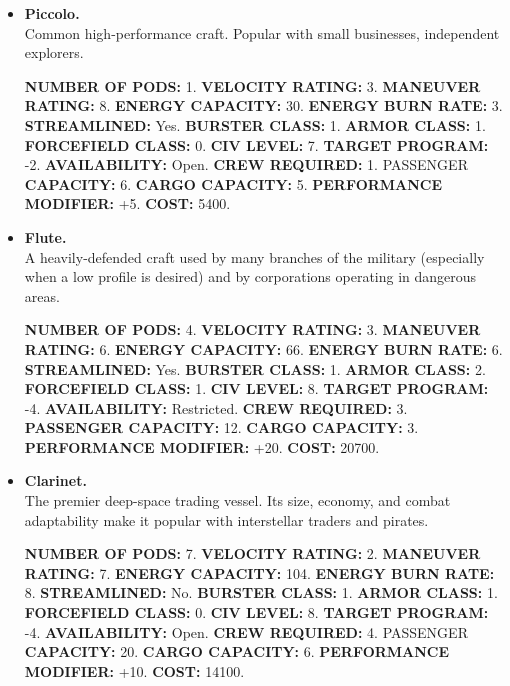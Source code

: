 \begin{itemize}
\item\textbf{\hypertarget{tag:harmonics-piccolo}{Piccolo}.}\\
  Common high-performance craft. Popular with small businesses,
  independent explorers.
  
  \textbf{NUMBER OF PODS:} 1. \textbf{VELOCITY RATING:} 3.
  \textbf{MANEUVER RATING:} 8. \textbf{ENERGY CAPACITY:} 30.
  \textbf{ENERGY BURN RATE:} 3. \textbf{STREAMLINED:}
  Yes. \textbf{BURSTER CLASS:} 1. \textbf{ARMOR CLASS:} 1.
  \textbf{FORCEFIELD CLASS:} 0. \textbf{CIV LEVEL:} 7. \textbf{TARGET
    PROGRAM:} -2. \textbf{AVAILABILITY:} Open. \textbf{CREW REQUIRED:}
  1. PASSENGER \textbf{CAPACITY:} 6. \textbf{CARGO CAPACITY:} 5.
  \textbf{PERFORMANCE MODIFIER:} +5. \textbf{COST:} 5400.
  

\item\textbf{Flute.}\\
  A heavily-defended craft used by many branches of the military
  (especially when a low profile is desired) and by corporations
  operating in dangerous areas.
  
  \textbf{NUMBER OF PODS:} 4. \textbf{VELOCITY RATING:} 3.
  \textbf{MANEUVER RATING:} 6. \textbf{ENERGY CAPACITY:} 66.
  \textbf{ENERGY BURN RATE:} 6.  \textbf{STREAMLINED:}
  Yes. \textbf{BURSTER CLASS:} 1. \textbf{ARMOR CLASS:} 2.
  \textbf{FORCEFIELD CLASS:} 1.  \textbf{CIV LEVEL:} 8. \textbf{TARGET
    PROGRAM:} -4. \textbf{AVAILABILITY:} Restricted. \textbf{CREW
    REQUIRED:} 3.  \textbf{PASSENGER CAPACITY:} 12. \textbf{CARGO
    CAPACITY:} 3. \textbf{PERFORMANCE MODIFIER:} +20. \textbf{COST:}
  20700.
  

\item\textbf{Clarinet.}\\
  The premier deep-space trading vessel. Its size, economy, and combat
  adaptability make it popular with interstellar traders and pirates.
  
  \textbf{NUMBER OF PODS:} 7. \textbf{VELOCITY RATING:} 2.
  \textbf{MANEUVER RATING:} 7. \textbf{ENERGY CAPACITY:} 104.
  \textbf{ENERGY BURN RATE:} 8. \textbf{STREAMLINED:}
  No. \textbf{BURSTER CLASS:} 1. \textbf{ARMOR CLASS:} 1.
  \textbf{FORCEFIELD CLASS:} 0. \textbf{CIV LEVEL:} 8. \textbf{TARGET
    PROGRAM:} -4. \textbf{AVAILABILITY:} Open. \textbf{CREW REQUIRED:}
  4. PASSENGER \textbf{CAPACITY:} 20. \textbf{CARGO CAPACITY:} 6.
  \textbf{PERFORMANCE MODIFIER:} +10. \textbf{COST:} 14100.
\end{itemize}


